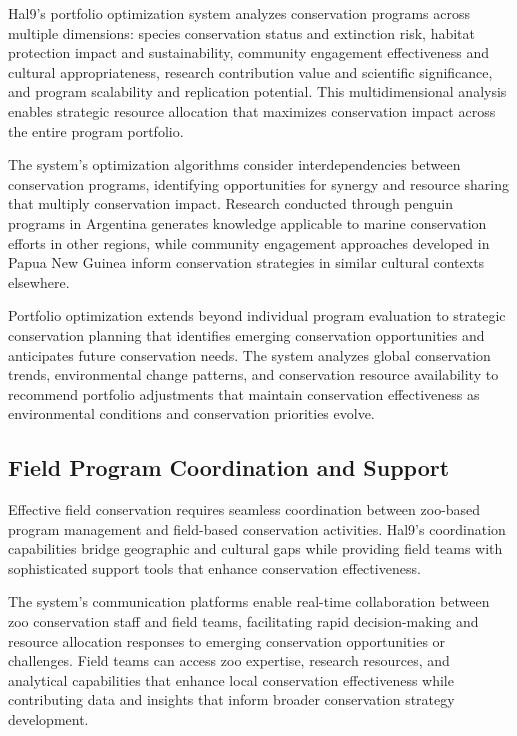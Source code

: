 \documentclass[
  Letterpaper,
]{scrbook}
\begin{document}
Hal9's portfolio optimization system analyzes conservation programs
across multiple dimensions: species conservation status and extinction
risk, habitat protection impact and sustainability, community engagement
effectiveness and cultural appropriateness, research contribution value
and scientific significance, and program scalability and replication
potential. This multidimensional analysis enables strategic resource
allocation that maximizes conservation impact across the entire program
portfolio.

The system's optimization algorithms consider interdependencies between
conservation programs, identifying opportunities for synergy and
resource sharing that multiply conservation impact. Research conducted
through penguin programs in Argentina generates knowledge applicable to
marine conservation efforts in other regions, while community engagement
approaches developed in Papua New Guinea inform conservation strategies
in similar cultural contexts elsewhere.

Portfolio optimization extends beyond individual program evaluation to
strategic conservation planning that identifies emerging conservation
opportunities and anticipates future conservation needs. The system
analyzes global conservation trends, environmental change patterns, and
conservation resource availability to recommend portfolio adjustments
that maintain conservation effectiveness as environmental conditions and
conservation priorities evolve.

\subsection{Field Program Coordination and
Support}\label{field-program-coordination-and-support}

Effective field conservation requires seamless coordination between
zoo-based program management and field-based conservation activities.
Hal9's coordination capabilities bridge geographic and cultural gaps
while providing field teams with sophisticated support tools that
enhance conservation effectiveness.

The system's communication platforms enable real-time collaboration
between zoo conservation staff and field teams, facilitating rapid
decision-making and resource allocation responses to emerging
conservation opportunities or challenges. Field teams can access zoo
expertise, research resources, and analytical capabilities that enhance
local conservation effectiveness while contributing data and insights
that inform broader conservation strategy development.
\end{document}
